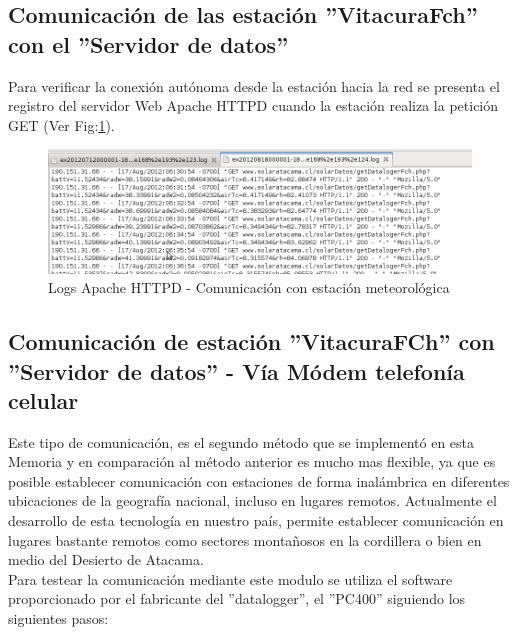 \subsection{Comunicación de las estación ''VitacuraFch'' con el ''Servidor de datos''}
Para verificar la conexión autónoma desde la estación hacia la red se presenta el registro del servidor Web Apache HTTPD cuando la estación realiza la petición GET (Ver Fig:\ref{pruebasLog1}).

\begin{figure}[h!]
        \centering
        \includegraphics[width=400pt]{images/pruebasLog1}
        \caption{Logs Apache HTTPD - Comunicación con estación meteorológica}
        \label{pruebasLog1}
\end{figure}

\subsection{Comunicación de estación ''VitacuraFCh'' con ''Servidor de datos'' - Vía Módem telefonía celular}
Este tipo de comunicación, es el segundo método que se implementó en esta Memoria y en comparación al método anterior es mucho mas flexible, ya que es posible establecer comunicación con estaciones de forma inalámbrica en diferentes ubicaciones de la geografía nacional, incluso en lugares remotos. Actualmente el desarrollo de esta tecnología en nuestro país, permite establecer comunicación en lugares bastante remotos como sectores montañosos en la cordillera o bien en medio del Desierto de Atacama.\\

Para testear la comunicación mediante este modulo se utiliza el software proporcionado por el fabricante del ''datalogger'', el ''PC400'' siguiendo los siguientes pasos:

